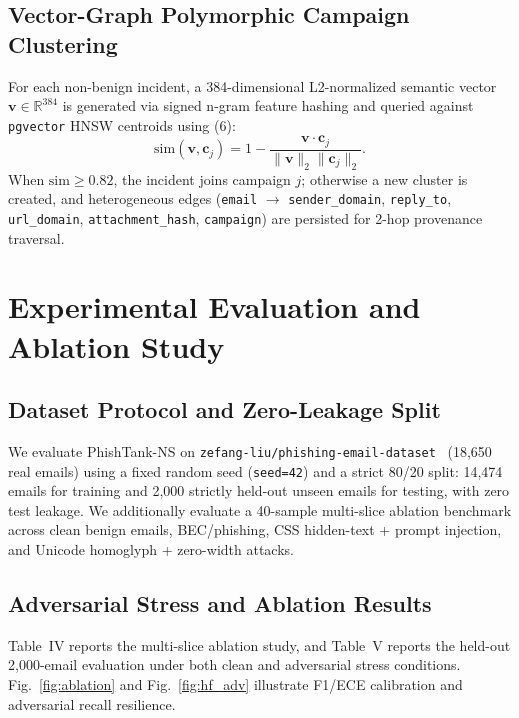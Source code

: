 \documentclass[conference]{IEEEtran}
\begin{document}
\subsection{Vector-Graph Polymorphic Campaign Clustering}
For each non-benign incident, a 384-dimensional L2-normalized semantic vector $\mathbf{v} \in \mathbb{R}^{384}$ is generated via signed n-gram feature hashing and queried against \texttt{pgvector} HNSW centroids using (6):
\begin{equation}
    \text{sim}(\mathbf{v}, \mathbf{c}_j) = 1 - \frac{\mathbf{v} \cdot \mathbf{c}_j}{\|\mathbf{v}\|_2 \|\mathbf{c}_j\|_2}.
\end{equation}
When $\text{sim} \ge 0.82$, the incident joins campaign $j$; otherwise a new cluster is created, and heterogeneous edges (\texttt{email} $\to$ \texttt{sender\_domain}, \texttt{reply\_to}, \texttt{url\_domain}, \texttt{attachment\_hash}, \texttt{campaign}) are persisted for 2-hop provenance traversal.

\section{Experimental Evaluation and Ablation Study}

\subsection{Dataset Protocol and Zero-Leakage Split}
We evaluate PhishTank-NS on \texttt{zefang-liu/phishing-email-dataset}~\cite{zefang2024phishing} (18,650 real emails) using a fixed random seed (\texttt{seed=42}) and a strict 80/20 split: 14,474 emails for training and 2,000 strictly held-out unseen emails for testing, with zero test leakage. We additionally evaluate a 40-sample multi-slice ablation benchmark across clean benign emails, BEC/phishing, CSS hidden-text + prompt injection, and Unicode homoglyph + zero-width attacks.

\subsection{Adversarial Stress and Ablation Results}
Table~IV reports the multi-slice ablation study, and Table~V reports the held-out 2,000-email evaluation under both clean and adversarial stress conditions. Fig.~\ref{fig:ablation} and Fig.~\ref{fig:hf_adv} illustrate F1/ECE calibration and adversarial recall resilience.
\end{document}
